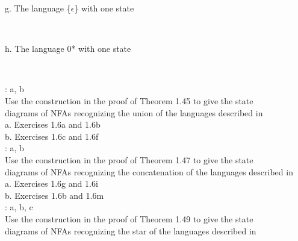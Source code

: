 \documentclass[12pt]{article}
\begin{document}
g. The language \{$\epsilon$\} with one state \\
\begin{center}
     \\
\end{center}


h. The language 0* with one state \\
\begin{center}
     \\
\end{center}


: a, b \\
Use the construction in the proof of Theorem 1.45 to give the state \\
diagrams of NFAs recognizing the union of the languages described in \\

a. Exercises 1.6a and 1.6b \\

b. Exercises 1.6c and 1.6f \\

: a, b \\
Use the construction in the proof of Theorem 1.47 to give the state \\
diagrams of NFAs recognizing the concatenation of the languages described in \\

a. Exercises 1.6g and 1.6i \\

b. Exercises 1.6b and 1.6m \\

: a, b, c \\
Use the construction in the proof of Theorem 1.49 to give the state \\
diagrams of NFAs recognizing the star of the languages described in \\
\end{document}
